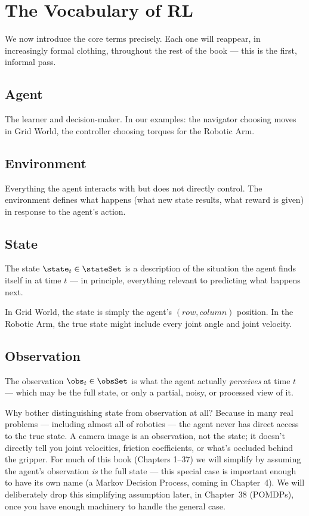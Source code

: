 \section{The Vocabulary of RL}

We now introduce the core terms precisely. Each one will reappear, in
increasingly formal clothing, throughout the rest of the book — this is
the first, informal pass.

\subsection*{Agent}
The learner and decision-maker. In our examples: the navigator choosing
moves in Grid World, the controller choosing torques for the Robotic Arm.

\subsection*{Environment}
Everything the agent interacts with but does not directly control.
The environment defines what happens (what new state results, what
reward is given) in response to the agent's action.

\subsection*{State}
\begin{definition}
The state $\state_t \in \stateSet$ is a description of the situation the
agent finds itself in at time $t$ — in principle, everything relevant to
predicting what happens next.
\end{definition}
In Grid World, the state is simply the agent's $(row, column)$ position.
In the Robotic Arm, the true state might include every joint angle and
joint velocity.

\subsection*{Observation}
\begin{definition}
The observation $\obs_t \in \obsSet$ is what the agent actually
\emph{perceives} at time $t$ — which may be the full state, or only a
partial, noisy, or processed view of it.
\end{definition}

\begin{whythisworks}
Why bother distinguishing state from observation at all? Because in many
real problems — including almost all of robotics — the agent never has
direct access to the true state. A camera image is an observation, not
the state; it doesn't directly tell you joint velocities, friction
coefficients, or what's occluded behind the gripper. For much of this
book (Chapters 1–37) we will simplify by assuming the agent's observation
\emph{is} the full state — this special case is important enough to have
its own name (a Markov Decision Process, coming in Chapter~4). We will
deliberately drop this simplifying assumption later, in Chapter~38
(POMDPs), once you have enough machinery to handle the general case.
\end{whythisworks}

